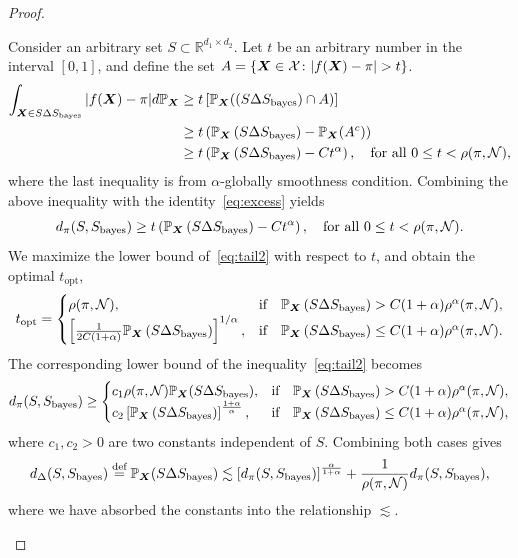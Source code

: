 \documentclass[11pt]{article}
\theoremstyle{plain}
\theoremstyle{definition}
\def\bayesS{S_{\textup{bayes}}}
\begin{document}
\begin{proof}
\begin{enumerate}[label={2.\arabic*},wide, labelwidth=!, labelindent=0pt]
Consider an arbitrary set $S\subset\mathbb{R}^{d_1\times d_2}$. Let $t$ be an arbitrary number in the interval $[0,1]$, and define the set $A=\{\mX\in \tX \colon |f(\mX)-\pi|>t\}$. 
\begin{align}
\int_{\bm X\in S\Delta S_{\text{bayes}}}|f(\bm X)-\pi|d \mathbb{P}_{\bm X} &\geq t \left[\mathbb{P}_{\bm X}(\left(S\Delta S_{\text{bayes}}) \cap A\right)\right] \\
&\geq t\left( \mathbb{P}_{\bm X}\left(S\Delta S_{\text{bayes}}\right) - \mathbb{P}_{\bm X}(A^c)\right)\\
&\geq t\left( \mathbb{P}_{\bm X}\left(S\Delta S_{\text{bayes}}\right) - Ct^{\alpha}\right),\quad \text{for all }0\leq t < \rho(\pi,\mathcal{N}),
\end{align}
where the last inequality is from $\alpha$-globally smoothness condition.
Combining the above inequality with the identity~\eqref{eq:excess} yields
\begin{equation}\label{eq:tail2}
d_\pi(S,\bayesS)\geq t\left( \mathbb{P}_{\mX}\left(S\Delta S_{\text{bayes}}\right) - Ct^{\alpha}\right),\quad \text{for all }0\leq t < \rho(\pi,\tN).
\end{equation}
We maximize the lower bound of~\eqref{eq:tail2} with respect to $t$, and obtain the optimal $t_{\text{opt}}$,
\[
t_{\text{opt}}=\begin{cases}
\rho(\pi,\mathcal{N}), & \text{if}\quad \mathbb{P}_{\bm X}\left(S\Delta S_{\text{bayes}}\right)> C(1+\alpha)\rho^\alpha(\pi,\mathcal{N}),\\
\left[{1\over 2C(1+\alpha)}\mathbb{P}_{\bm X}\left(S\Delta S_{\text{bayes}}\right)\right]^{1 / \alpha}, & \text{if}\quad \mathbb{P}_{\bm X}\left(S\Delta S_{\text{bayes}}\right)\leq C(1+\alpha) \rho^\alpha(\pi,\mathcal{N}).
\end{cases}
\]
The corresponding lower bound of the inequality~\eqref{eq:tail2} becomes
\begin{align}
  d_\pi(S,\bayesS)\geq\begin{cases}
c_1\rho(\pi,\tN)\mathbb{P}_{\mX}(S\Delta \bayesS), & \text{if}\quad \mathbb{P}_{\mX}\left(S\Delta S_{\text{bayes}}\right)> C(1+\alpha)\rho^\alpha(\pi,\tN),\\
c_2 \left[\mathbb{P}_{\mX}\left(S\Delta S_{\text{bayes}}\right)\right]^{1+\alpha \over \alpha}, & \text{if}\quad \mathbb{P}_{\mX}\left(S\Delta S_{\text{bayes}}\right)\leq C(1+\alpha) \rho^\alpha(\pi,\tN),
\end{cases}
\end{align}
where $c_1,c_2>0$ are two constants independent of $S$. Combining both cases gives
\begin{align}\label{eq:cmultiidentity}
    d_\Delta(S,\bayesS) \stackrel{\text{def}}{=}\mathbb{P}_{\mX}(S\Delta\bayesS)\lesssim \left[d_\pi(S,\bayesS)\right]^{\alpha \over 1+\alpha}+\frac{1}{\rho(\pi,\tN)}d_\pi(S,\bayesS),
\end{align}
where we have absorbed the constants into the relationship $\lesssim$. 


\end{enumerate}
\end{proof}
\end{document}

